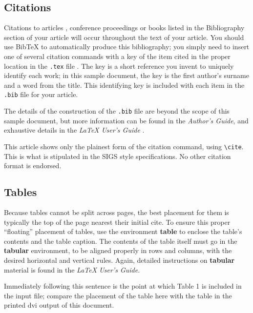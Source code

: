 \documentclass{acm_proc_article-sp}
\begin{document}
\subsection{Citations}
\label{sec-3-3}

Citations to articles \cite{bowman:reasoning, clark:pct, braams:babel, herlihy:methodology}, conference proceedings \cite{clark:pct} or
books \cite{salas:calculus, Lamport:LaTeX} listed in the Bibliography section of your
article will occur throughout the text of your article.  You should
use BibTeX to automatically produce this bibliography; you simply need
to insert one of several citation commands with a key of the item
cited in the proper location in the \texttt{.tex} file \cite{Lamport:LaTeX}.  The
key is a short reference you invent to uniquely identify each work; in
this sample document, the key is the first author's surname and a word
from the title.  This identifying key is included with each item in
the \texttt{.bib} file for your article.

The details of the construction of the \texttt{.bib} file are beyond the
scope of this sample document, but more information can be found in
the \emph{Author's Guide}, and exhaustive details in the \emph{\LaTeX{} User's Guide} \cite{Lamport:LaTeX}.

This article shows only the plainest form of the citation command,
using \texttt{\textbackslash{}cite}.  This is what is stipulated in the SIGS style
specifications.  No other citation format is endorsed.
\subsection{Tables}
\label{sec-3-4}

Because tables cannot be split across pages, the best placement for
them is typically the top of the page nearest their initial cite.  To
ensure this proper ``floating'' placement of tables, use the
environment \textbf{table} to enclose the table's contents and the table
caption.  The contents of the table itself must go in the \textbf{tabular}
environment, to be aligned properly in rows and columns, with the
desired horizontal and vertical rules.  Again, detailed instructions
on \textbf{tabular} material is found in the \emph{\LaTeX{} User's Guide}.

Immediately following this sentence is the point at which Table 1 is
included in the input file; compare the placement of the table here
with the table in the printed dvi output of this document.
\end{document}
